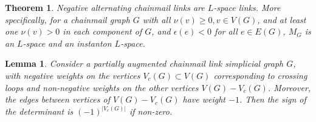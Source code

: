 \documentclass[10pt,a4paper]{amsart}
\newtheorem{theorem}{Theorem}
\newtheorem{lemma}{Lemma}
\begin{document}
\begin{theorem} \label{alternating}
Negative alternating chainmail links are $L$-space links. More specifically, for a chainmail graph $G$ with all $\nu(v)\geq 0, v\in V(G)$, and at least one $\nu(v)>0$ in each component of $G$, and $\epsilon(e) < 0$ for all $e\in E(G)$,  $M_G$ is an $L$-space and an instanton $L$-space.
\end{theorem}

\begin{lemma}
Consider a partially augmented chainmail link simplicial graph $G$, with negative weights on the vertices $V_c(G) \subset V(G)$ corresponding to crossing loops and non-negative weights on the other vertices $V(G)-V_c(G)$. Moreover, the edges between vertices of $V(G)-V_c(G)$ have weight $-1$. Then the sign of the determinant is $(-1)^{|V_c(G)|}$ if non-zero. 

\end{lemma}
\end{document}
